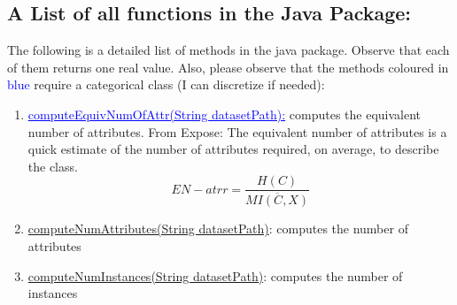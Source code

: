 \documentclass[a4paper,12pt, english]{article}
\begin{document}
\subsection{A List of all functions in the Java Package:}
The following is a detailed list of methods in the java package. Observe that each of them returns one real value. Also, please observe that the methods coloured in \textcolor{blue}{blue} require a categorical class (I can discretize if needed):
\begin{enumerate}
	
	\item \textcolor{blue}{\underline{computeEquivNumOfAttr(String datasetPath):}} computes the equivalent number of attributes. From Expose: The equivalent number of attributes is a quick estimate of the number of attributes required, on average, to describe the class. \begin{equation} EN-atrr=\frac{H(C)}{\overline{MI(C,X)}} \end{equation} 

	\item \underline{computeNumAttributes(String datasetPath)}: computes the number of attributes
	\item \underline{computeNumInstances(String datasetPath)}: computes the number of instances
	

\end{enumerate}
\end{document}
